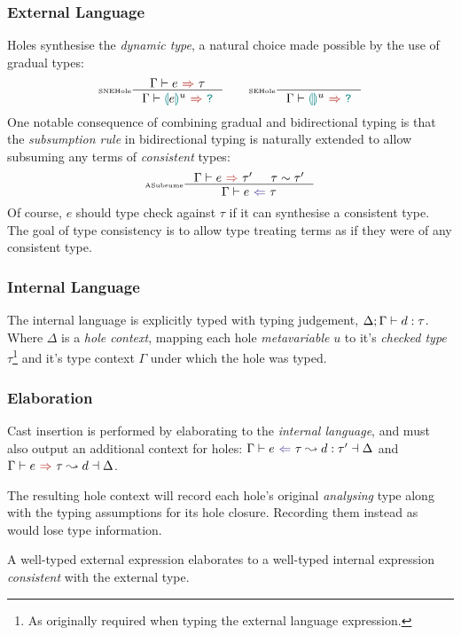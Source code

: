 \subsubsection{External Language}\label{sec:HazelExternalLang}
Holes synthesise the \textit{dynamic type}, a natural choice made possible by the use of gradual types:
\[\inference[\tiny SNEHole]{\synthesis{e}{\tau}}{\synthesis{\hole[e]^u}{\dyn}} \qquad \inference[\tiny SEHole]{}{\synthesis{\hole^u}{\dyn}}\] 
One notable consequence of combining gradual and bidirectional typing is that the \textit{subsumption rule} in bidirectional typing is naturally extended to allow subsuming any terms of \textit{consistent} types:
\[\inference[\tiny ASubsume]{\synthesis{e}{\tau'}& \tau \sim \tau'}{\analysis{e}{\tau}}\]
Of course, $e$ should type check against $\tau$ if it can synthesise a consistent type. The goal of type consistency is to allow type treating terms as if they were of any consistent type.

\subsubsection{Internal Language}\label{sec:HazelInternalLang}
The internal language is explicitly typed with typing judgement, $\Delta;\Gamma \vdash d : \tau$. Where $\Delta$ is a \textit{hole context}, mapping each hole \textit{metavariable} $u$ to it's \textit{checked type} $\tau$\footnote{As originally required when typing the external language expression.} and it's type context $\Gamma$ under which the hole was typed.

\subsubsection{Elaboration}\label{sec:HazelElaboration}
Cast insertion is performed by elaborating to the \textit{internal language}, and must also output an additional context for holes: $\elaborationAnalysis{e}{\tau}{d}{\tau'}{\Delta}$ and $\elaborationSynthesis{e}{\tau}{d}{\Delta}$.

The resulting hole context will record each hole's original \textit{analysing} type along with the typing assumptions for its hole closure. Recording them instead as {\dyn} would lose type information.

A well-typed external expression elaborates to a well-typed internal expression \textit{consistent} with the external type.

